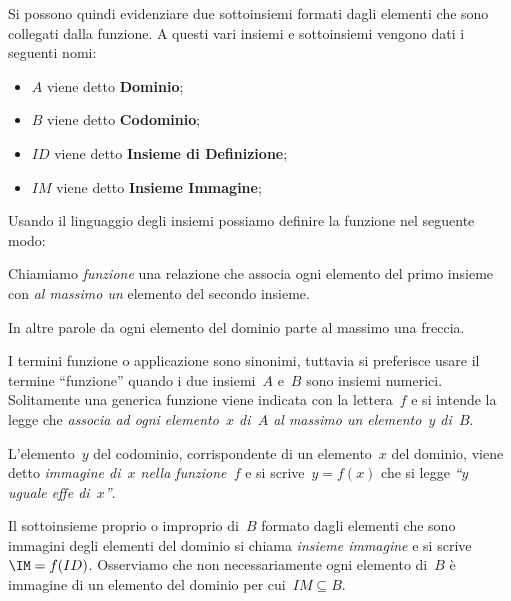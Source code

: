 Si possono quindi evidenziare due sottoinsiemi formati dagli elementi che 
sono collegati dalla funzione.
A questi vari insiemi e sottoinsiemi vengono dati i seguenti nomi:
\begin{itemize} [noitemsep]
\item \(A\) viene detto \textbf{Dominio};
\item \(B\) viene detto \textbf{Codominio};
\item \(ID\) viene detto \textbf{Insieme di Definizione};
\item \(IM\) viene detto \textbf{Insieme Immagine};
\end{itemize}

Usando il linguaggio degli insiemi possiamo definire la funzione nel seguente 
modo:

\begin{definizione}
Chiamiamo \emph{funzione} una relazione che associa ogni elemento del 
primo insieme con \emph{al massimo un} elemento del secondo insieme.
\end{definizione}
In altre parole da ogni elemento del dominio parte al massimo una freccia.
\begin{center}
\begin{inaccessibleblock}
\end{inaccessibleblock}
\end{center}

I termini funzione o applicazione sono sinonimi, tuttavia si preferisce
usare il termine ``funzione'' quando i due insiemi~\(A\) e~\(B\) sono insiemi 
numerici. 
Solitamente una generica funzione viene indicata con la lettera~\(f\) e si 
intende la legge che \emph{associa ad ogni elemento~\(x\) di~\(A\) al massimo 
un elemento~\(y\) di~\(B\)}.

\begin{definizione}
 L'elemento~\(y\) del codominio, corrispondente di un elemento~\(x\) del 
dominio, viene detto \emph{immagine di~\(x\) nella funzione~\(f\)} e
si scrive~\(y = f(x)\) che si legge \emph{``\(y\) uguale effe di~\(x\)''}.
\end{definizione}

Il sottoinsieme proprio o improprio di~\(B\) formato dagli elementi che sono
immagini degli elementi del dominio si chiama
\emph{insieme immagine} e si scrive~\(\IM = f(ID)\). 
Osserviamo che non necessariamente ogni elemento di~\(B\) è immagine di un 
elemento del dominio per cui~\(IM \subseteq B\).

